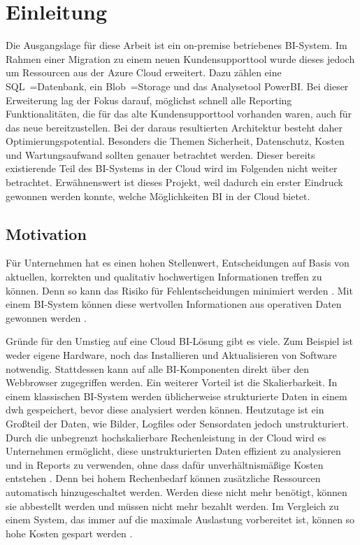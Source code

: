 \chapter{Einleitung} \label{ch:intro}
Die Ausgangslage für diese Arbeit ist ein on-premise betriebenes BI-System. Im Rahmen einer Migration zu einem neuen Kundensupporttool wurde dieses jedoch um Ressourcen aus der Azure Cloud erweitert. Dazu zählen eine SQL~=Datenbank, ein Blob~=Storage und das Analysetool PowerBI. Bei dieser Erweiterung lag der Fokus darauf, möglichst schnell alle Reporting Funktionalitäten, die für das alte Kundensupporttool vorhanden waren, auch für das neue bereitzustellen. Bei der daraus resultierten Architektur besteht daher Optimierungspotential. Besonders die Themen Sicherheit, Datenschutz, Kosten und Wartungsaufwand sollten genauer betrachtet werden. Dieser bereits existierende Teil des BI-Systems in der Cloud wird im Folgenden nicht weiter betrachtet. Erwähnenswert ist dieses Projekt, weil dadurch ein erster Eindruck gewonnen werden konnte, welche Möglichkeiten BI in der Cloud bietet.

\section{Motivation} \label{sec:intro:motivation}
Für Unternehmen hat es einen hohen Stellenwert, Entscheidungen auf Basis von aktuellen, korrekten und qualitativ hochwertigen Informationen treffen zu können. Denn so kann das Risiko für Fehlentscheidungen minimiert werden \cite{grunwald_business_2009}. Mit einem BI-System können diese wertvollen Informationen aus operativen Daten gewonnen werden \cite{muller_business_2013}.

Gründe für den Umstieg auf eine Cloud BI-Lösung gibt es viele. Zum Beispiel ist weder eigene Hardware, noch das Installieren und Aktualisieren von Software notwendig. Stattdessen kann auf alle BI-Komponenten direkt über den Webbrowser zugegriffen werden. Ein weiterer Vorteil ist die Skalierbarkeit. In einem klassischen BI-System werden üblicherweise strukturierte Daten in einem \ac{dwh} gespeichert, bevor diese analysiert werden können. Heutzutage ist ein Großteil der Daten, wie Bilder, Logfiles oder Sensordaten jedoch unstrukturiert. Durch die unbegrenzt hochskalierbare Rechenleistung in der Cloud wird es Unternehmen ermöglicht, diese unstrukturierten Daten effizient zu analysieren und in Reports zu verwenden, ohne dass dafür unverhältnismäßige Kosten entstehen \cite{gurjar_cloud_2013}. Denn bei hohem Rechenbedarf können zusätzliche Ressourcen automatisch hinzugeschaltet werden. Werden diese nicht mehr benötigt, können sie abbestellt werden und müssen nicht mehr bezahlt werden. Im Vergleich zu einem System, das immer auf die maximale Auslastung vorbereitet ist, können so hohe Kosten gespart werden \cite{ouf_cloud_2011}.

